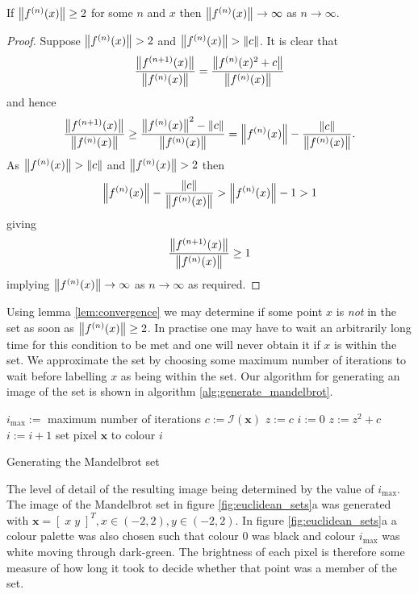 \begin{lemma} 
\label{lem:convergence}
If $\left\Vert f^{(n)}(x) \right\Vert \ge 2$
for some $n$ and $x$ then $\left\Vert f^{(n)}(x) \right\Vert \rightarrow \infty$ as $n
\rightarrow \infty$.
\begin{proof}Suppose 
$\left\Vert f^{(n)}(x) \right\Vert > 2$ and $\left\Vert f^{(n)}(x) \right\Vert > \left\Vert c \right\Vert$. It is
clear that
\[
\frac{\left\Vert f^{(n+1)}(x) \right\Vert}{\left\Vert f^{(n)}(x) \right\Vert} =
\frac{\left\Vert f^{(n)}(x)^2 + c \right\Vert}{\left\Vert f^{(n)}(x) \right\Vert}
\]
and hence
\[
\frac{\left\Vert f^{(n+1)}(x) \right\Vert}{\left\Vert f^{(n)}(x) \right\Vert} \ge 
\frac{\left\Vert f^{(n)}(x) \right\Vert^2 - \left\Vert c \right\Vert}{\left\Vert f^{(n)}(x) \right\Vert} =
\left\Vert f^{(n)}(x) \right\Vert - \frac{\left\Vert c \right\Vert}{\left\Vert f^{(n)}(x) \right\Vert}.
\]
As $\left\Vert f^{(n)}(x) \right\Vert > \left\Vert c \right\Vert$ and $\left\Vert f^{(n)}(x) \right\Vert > 2$ then
\[
\left\Vert f^{(n)}(x) \right\Vert - \frac{\left\Vert c \right\Vert}{\left\Vert f^{(n)}(x) \right\Vert} >
\left\Vert f^{(n)}(x) \right\Vert - 1 > 1
\]
giving
\[
\frac{\left\Vert f^{(n+1)}(x) \right\Vert}{\left\Vert f^{(n)}(x) \right\Vert} \ge 1
\]
implying $\left\Vert f^{(n)}(x) \right\Vert \rightarrow \infty$ as $n
\rightarrow \infty$ as required.
\end{proof}
\end{lemma}

Using lemma \ref{lem:convergence} we may determine if some point $x$ is
\emph{not} in the set as soon as $\left\Vert f^{(n)}(x) \right\Vert \ge 2$.  In practise one
may have to wait an arbitrarily long time for this condition to be met and one
will never obtain it if $x$ is within the set. We approximate the set by
choosing some maximum number of iterations to wait before labelling $x$ as
being within the set.  Our algorithm for generating an image of the set is
shown in algorithm \ref{alg:generate_mandelbrot}.

\begin{fancyalg}
\begin{algorithmic}[1]
\STATE $i_{\mathrm{max}} :=$ maximum number of iterations
\STATE $c := {\mathcal I}(\mathbf{x})$
\STATE $z := c$
\STATE $i := 0$
  \STATE $z := z^2 + c$
  \STATE $i := i+1$
\ENDWHILE 
\STATE set pixel $\mathbf{x}$ to colour $i$
\ENDFOR
\end{algorithmic}
\caption{
\label{alg:generate_mandelbrot}
  Generating the Mandelbrot set}
\end{fancyalg}

The level of detail of the resulting image being determined by the value of $i_{\mathrm{max}}$.
The image of the Mandelbrot set in figure \ref{fig:euclidean_sets}a was
generated with $\mathbf{x} = [\;x\;y\;]^T, x \in (-2,2), y \in (-2,2)$.
In figure \ref{fig:euclidean_sets}a a colour palette was also chosen such that colour 0 was black
and colour $i_{\mathrm{max}}$ was white moving through dark-green. The brightness of
each pixel is therefore some measure of how long it took to decide whether that point was
a member of the set.

